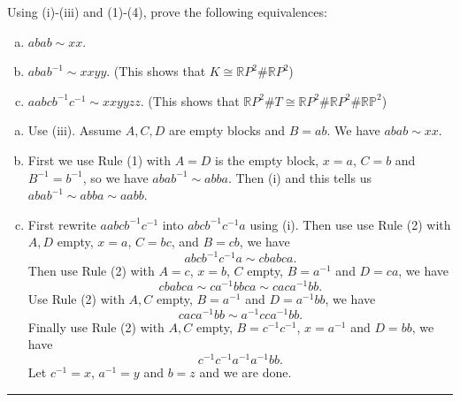 \documentclass[a4paper, 12pt]{article}
\begin{document}
\begin{problem}{6}
Using (i)-(iii) and (1)-(4), prove the following equivalences:
\begin{enumerate}[(a)]
\item \(abab\sim xx\).
\item \(abab^{-1}\sim xxyy\). (This shows that \(K\cong \mathbb{R}P^2\#\mathbb{R}P^2\))
\item \(aabcb^{-1}c^{-1}\sim xxyyzz\). (This shows that \(\mathbb{R}P^2\# T\cong \mathbb{R}P^2\# \mathbb{R}P^2\# \mathbb{RP}^2\))
\end{enumerate}
\end{problem}
\begin{solution}
\begin{enumerate}[(a)]
\item Use (iii). Assume \(A,C,D\) are empty blocks and \(B=ab\). We have \(abab\sim xx\).
\item First we use Rule (1) with \(A=D\) is the empty block, \(x=a\), \(C=b\) and \(B^{-1}=b^{-1}\), so we have \(abab^{-1}\sim abba\). Then (i) and this tells us \(abab^{-1}\sim abba\sim aabb\).
\item First rewrite \(aabcb^{-1}c^{-1}\) into \(abcb^{-1}c^{-1}a\) using (i). Then use use Rule (2) with \(A,D\) empty, \(x=a\), \(C=bc\), and \(B=cb\), we have 
\[abcb^{-1}c^{-1}a\sim cbabca.\]
Then use Rule (2) with \(A=c\), \(x=b\), \(C\) empty, \(B=a^{-1}\) and \(D=ca\), we have 
\[cbabca\sim ca^{-1}bbca\sim caca^{-1}bb.\]
Use Rule (2) with \(A,C\) empty, \(B=a^{-1}\) and \(D=a^{-1}bb\), we have 
\[caca^{-1}bb\sim a^{-1}cca^{-1}bb.\]
Finally use Rule (2) with \(A,C\) empty, \(B=c^{-1}c^{-1}\), \(x=a^{-1}\) and \(D=bb\), we have 
\[c^{-1}c^{-1}a^{-1}a^{-1}bb.\]
Let \(c^{-1}=x\), \(a^{-1}=y\) and \(b=z\) and we are done.
\end{enumerate}
\end{solution}

\noindent\rule{7in}{2.8pt}
\end{document}
